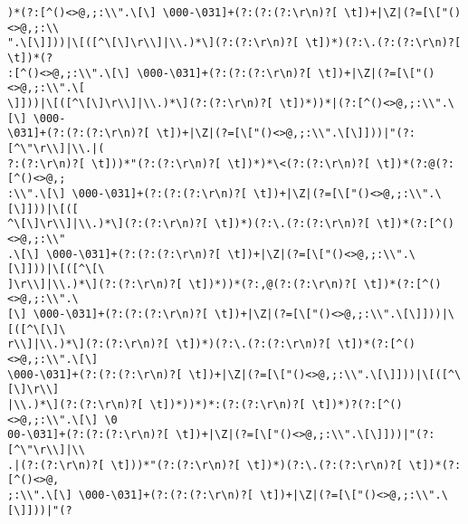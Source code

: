 \documentclass[]{book}
\begin{document}
\begin{verbatim}
)*(?:[^()<>@,;:\\".\[\] \000-\031]+(?:(?:(?:\r\n)?[ \t])+|\Z|(?=[\["()<>@,;:\\
".\[\]]))|\[([^\[\]\r\\]|\\.)*\](?:(?:\r\n)?[ \t])*)(?:\.(?:(?:\r\n)?[ \t])*(?
:[^()<>@,;:\\".\[\] \000-\031]+(?:(?:(?:\r\n)?[ \t])+|\Z|(?=[\["()<>@,;:\\".\[
\]]))|\[([^\[\]\r\\]|\\.)*\](?:(?:\r\n)?[ \t])*))*|(?:[^()<>@,;:\\".\[\] \000-
\031]+(?:(?:(?:\r\n)?[ \t])+|\Z|(?=[\["()<>@,;:\\".\[\]]))|"(?:[^\"\r\\]|\\.|(
?:(?:\r\n)?[ \t]))*"(?:(?:\r\n)?[ \t])*)*\<(?:(?:\r\n)?[ \t])*(?:@(?:[^()<>@,;
:\\".\[\] \000-\031]+(?:(?:(?:\r\n)?[ \t])+|\Z|(?=[\["()<>@,;:\\".\[\]]))|\[([
^\[\]\r\\]|\\.)*\](?:(?:\r\n)?[ \t])*)(?:\.(?:(?:\r\n)?[ \t])*(?:[^()<>@,;:\\"
.\[\] \000-\031]+(?:(?:(?:\r\n)?[ \t])+|\Z|(?=[\["()<>@,;:\\".\[\]]))|\[([^\[\
]\r\\]|\\.)*\](?:(?:\r\n)?[ \t])*))*(?:,@(?:(?:\r\n)?[ \t])*(?:[^()<>@,;:\\".\
[\] \000-\031]+(?:(?:(?:\r\n)?[ \t])+|\Z|(?=[\["()<>@,;:\\".\[\]]))|\[([^\[\]\
r\\]|\\.)*\](?:(?:\r\n)?[ \t])*)(?:\.(?:(?:\r\n)?[ \t])*(?:[^()<>@,;:\\".\[\] 
\000-\031]+(?:(?:(?:\r\n)?[ \t])+|\Z|(?=[\["()<>@,;:\\".\[\]]))|\[([^\[\]\r\\]
|\\.)*\](?:(?:\r\n)?[ \t])*))*)*:(?:(?:\r\n)?[ \t])*)?(?:[^()<>@,;:\\".\[\] \0
00-\031]+(?:(?:(?:\r\n)?[ \t])+|\Z|(?=[\["()<>@,;:\\".\[\]]))|"(?:[^\"\r\\]|\\
.|(?:(?:\r\n)?[ \t]))*"(?:(?:\r\n)?[ \t])*)(?:\.(?:(?:\r\n)?[ \t])*(?:[^()<>@,
;:\\".\[\] \000-\031]+(?:(?:(?:\r\n)?[ \t])+|\Z|(?=[\["()<>@,;:\\".\[\]]))|"(?

\end{verbatim}
\end{document}
